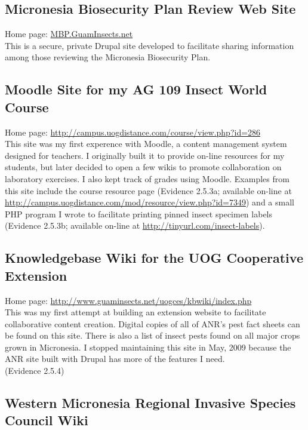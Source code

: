 \documentclass[12pt,oneside,english]{scrbook}
\begin{document}
\subsection{Micronesia Biosecurity Plan Review Web Site}

Home page: \url{MBP.GuamInsects.net}\\
This is a secure, private Drupal site developed to facilitate sharing
information among those reviewing the Micronesia Biosecurity Plan.

\subsection{Moodle Site for my AG 109 Insect World Course}

Home page: \url{http://campus.uogdistance.com/course/view.php?id=286}\\
This site was my first experence with Moodle, a content management
system designed for teachers. I originally built it to provide on-line
resources for my students, but later decided to open a few wikis to
promote collaboration on laboratory exercises. I also kept track of
grades using Moodle. Examples from this site include the course resource
page (Evidence 2.5.3a; available on-line at \url{http://campus.uogdistance.com/mod/resource/view.php?id=7349})
and a small PHP program I wrote to facilitate printing pinned insect
specimen labels (Evidence 2.5.3b; available on-line at \url{http://tinyurl.com/insect-labels}).

\subsection{Knowledgebase Wiki for the UOG Cooperative Extension }

Home page: \url{http://www.guaminsects.net/uogces/kbwiki/index.php}
\textbf{}\\
This was my first attempt at building an extension website to facilitate
collaborative content creation. Digital copies of all of ANR's pest
fact sheets can be found on this site. There is also a list of insect
pests found on all major crops grown in Micronesia. I stopped maintaining
this site in May, 2009 because the ANR site built with Drupal has
more of the features I need.\\
(Evidence 2.5.4)

\subsection{Western Micronesia Regional Invasive Species Council Wiki}
\end{document}
